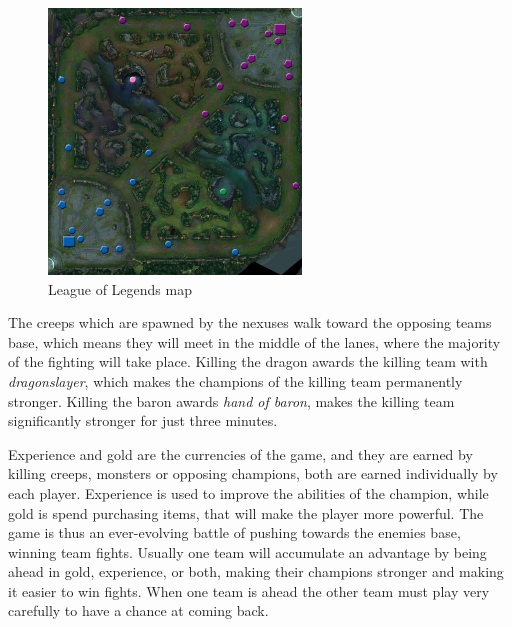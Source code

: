 \begin{figure}[!htb]
  \centering
    \includegraphics[width=0.6\textwidth]{img/lolmap.jpg}
  \caption{League of Legends map~\cite{lolmap}}\label{fig:lolmap}
\end{figure}

The creeps which are spawned by the nexuses walk toward the opposing teams base, which means they will meet in the middle of the lanes, where the majority of the fighting will take place. Killing the dragon awards the killing team with \emph{dragonslayer}, which makes the champions of the killing team permanently stronger. Killing the baron awards \emph{hand of baron}, makes the killing team significantly stronger for just three minutes.

Experience and gold are the currencies of the game, and they are earned by killing creeps, monsters or opposing champions, both are earned individually by each player. Experience is used to improve the abilities of the champion, while gold is spend purchasing items, that will make the player more powerful. The game is thus an ever-evolving battle of pushing towards the enemies base, winning team fights. Usually one team will accumulate an advantage by being ahead in gold, experience, or both, making their champions stronger and making it easier to win fights. When one team is ahead the other team must play very carefully to have a chance at coming back. 

